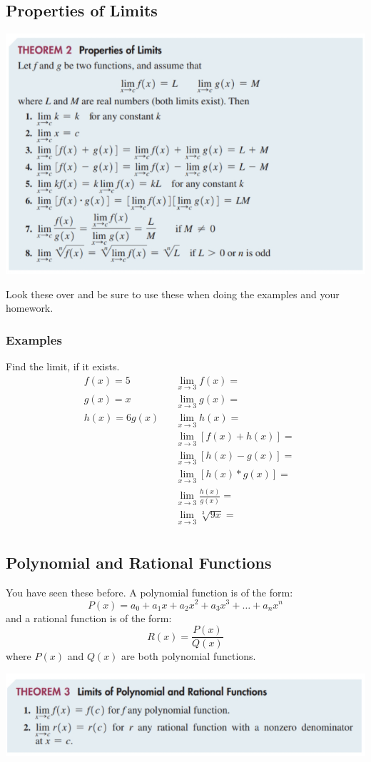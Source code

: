 \documentclass[14pt]{extarticle}
\begin{document}
\subsection{Properties of Limits}
\begin{center}
	\includegraphics[width=0.9\linewidth]{9-1-4}
\end{center}
Look these over and be sure to use these when doing the examples and your homework.
\subsubsection{Examples} Find the limit, if it exists.
\begin{align*}
	&f(x) = 5 & &\lim_{x\to 3}f(x) =  \\
	&g(x) = x & &\lim_{x\to 3}g(x) =  \\
	&h(x) = 6g(x) & &\lim_{x\to 3}h(x) =  \\
	& & &\lim_{x\to 3}[f(x) + h(x)] =  \\
	& & &\lim_{x\to 3}[h(x)-g(x)] =  \\
	& & &\lim_{x\to 3}[h(x)*g(x)] =  \\	
	& & &\lim_{x\to 3}\frac{h(x)}{g(x)} =  \\
	& & &\lim_{x\to 3}\sqrt[3]{9x} =  \\
\end{align*}

\subsection{Polynomial and Rational Functions} You have seen these before. A polynomial function is of the form:
$$P(x) = a_0 + a_1x + a_2x^2 + a_3x^3 + \hdots +a_nx^n$$
and a rational function is of the form:
$$ R(x) = \frac{P(x)}{Q(x)}$$
where $P(x)$ and $Q(x)$ are both polynomial functions.
\begin{center}
	\includegraphics[width=0.9\linewidth]{9-1-5}
\end{center}
\end{document}

